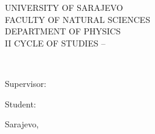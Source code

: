 \thispagestyle{empty}
\makeatletter

\begin{figure}[t]
	\centering
	\begin{minipage}{.8\textwidth}
		\centering
		{\DoubleSpacing
			\MakeUppercase{\large University of Sarajevo}\\
			\MakeUppercase{\large Faculty of Natural Sciences}\\
			\MakeUppercase{\large Department of Physics}\\
			\MakeUppercase{\large II cycle of studies -- \@smjereng}\\
		}
	\end{minipage}
\end{figure}
\vspace*{\fill}
\begin{center}
	{\LARGE\bfseries\MakeUppercase{\@nasloveng}\\}
	\vspace{1em}
	{\large\MakeUppercase{\@podnasloveng}}
\end{center}
\vspace*{\fill}
\begin{figure}[b]
	\centering
	\begin{minipage}[t]{\textwidth}
		\begin{minipage}[t]{0.66\textwidth}
			\large Supervisor:\\
			\@profesor
		\end{minipage}
		\begin{minipage}[t]{0.33\textwidth}
			\large Student:\\
			\@student
		\end{minipage}
	\end{minipage}

	\vspace{15mm}
	{\large Sarajevo, \@datumeng}
\end{figure}

\makeatother
\cleardoublepage
